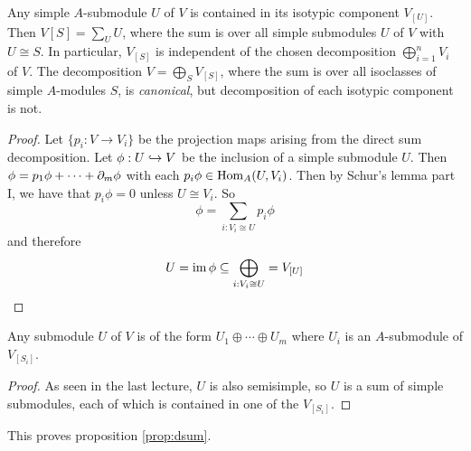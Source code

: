 \begin{thm}
	Any simple $A$-submodule $U$ of $V$ is contained in its isotypic component $V_{[U]}$.
	Then $V[S] = \sum_U U$, where the sum is over all simple submodules $U$ of $V$ with $U \cong S$.
	In particular, $V_[S]$ is independent of the chosen decomposition $\bigoplus_{i=1}^n V_i$ of $V$.
	The decomposition $V = \bigoplus_S V_{[S]}$, where the sum is over all isoclasses of simple $A$-modules $S$, is \emph{canonical}, but decomposition of each isotypic component is not.
\end{thm}

\begin{proof}
	Let $\{p_i: V \to V_i\}$ be the projection maps arising from the direct sum decomposition.
	Let $\phi: U \hookrightarrow V$ be the inclusion of a simple submodule $U$.
	Then $\phi = p_1\phi + \cdots + \partial_m\phi$ with each $p_i\phi \in \operatorname{Hom}_A(U,V_i)$.
	Then by Schur's lemma part I, we have that $p_i\phi=0$ unless $U \cong V_i$.
	So
	\[\phi = \sum_{i: V_i \cong U} p_i\phi\]
	and therefore
	\[U = \operatorname{im}\phi \subseteq \bigoplus_{i: V_i \cong U} = V_{[U]} \qedhere\]
\end{proof}

\begin{cor}
	Any submodule $U$ of $V$ is of the form $U_1 \oplus \cdots \oplus U_m$ where $U_i$ is an $A$-submodule of $V_{[S_i]}$.
\end{cor}

\begin{proof}
	As seen in the last lecture, $U$ is also semisimple, so $U$ is a sum of simple submodules, each of which is contained in one of the $V_{[S_i]}$.
\end{proof}

\begin{rmk}
	This proves proposition \ref{prop:dsum}.
\end{rmk}